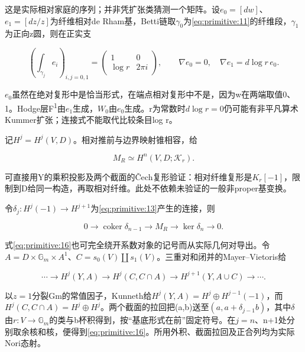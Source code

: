 \documentclass[11pt,a4paper,oneside]{ctexart}
\theoremstyle{cnplain}
\theoremstyle{definition}
\theoremstyle{remark}
\numberwithin{equation}{section}
\begin{document}
这是实际相对家庭的序列；并非凭扩张类猜测一个矩阵。设\(e_0=[dw]\)、\(e_1=[dz/z]\)为纤维相对de Rham基，Betti链取\(\gamma _0\)为\eqref{eq:primitive:11}的纤维段，\(\gamma _1\)为正向z圆，则在正实支

\begin{equation}
\left(\int_{\gamma_j}e_i\right)_{i,j=0,1}
       =\begin{pmatrix}1&0\\\log r&2\pi i\end{pmatrix},\qquad
 \nabla e_0=0,\quad \nabla e_1=d\log r\,e_0.                    \label{eq:primitive:14}
\end{equation}

\(e_0\)虽然在绝对复形中是恰当形式，在端点相对复形中不是，因为w在两端取值0、1。Hodge层F\textsuperscript{1}由\(e_1\)生成，\(W_0\)由\(e_0\)生成。r为常数时\(d\log  r=0\)仍可能有非平凡算术Kummer扩张；连接式不能取代比较条目log r。

记\(H^j=H^j(V,D)\)。相对推前与边界映射锥相容，给

\begin{equation}
M_R\simeq H^n(V,D;\mathcal K_r).               \label{eq:primitive:15}
\end{equation}

可直接用Y的乘积投影及两个截面的Čech复形验证：相对纤维复形是\(K_r[- 1]\)，限制到D给同一构造，再取相对纤维。此处不依赖未验证的一般非proper基变换。

令\(\delta _j:H^j(-1)\to H^{j+1}\)为\eqref{eq:primitive:13}产生的连接，则

\begin{equation}
0\longrightarrow\operatorname{coker}\delta_{n-1}
       \longrightarrow M_R\longrightarrow\ker\delta_n\longrightarrow0.
                                                                    \label{eq:primitive:16}
\end{equation}

式\eqref{eq:primitive:16}也可完全绕开系数对象的记号而从实际几何对导出。令\(A=D\times \mathbb G_m\times A^{1}\)、\(C=s_0(V)\)\ensuremath{\coprod}\(s_1(V)\)。三重对和闭并的Mayer--Vietoris给

\begin{equation}
\cdots\to H^j(Y,A)\to H^j(C,C\cap A)
             \to H^{j+1}(Y,A\cup C)\to\cdots .
\end{equation}

以\(z=1\)分裂Gm的常值因子，Kunneth给\(H^j(Y,A)=H^j\oplus H^{j-1}(-1)\)，而\(H^j(C,C\cap A)=H^j\oplus H^j\)。两个截面的拉回把(a,b)送至\((a,a+\delta _{j-1}b)\)，其中\(\delta \)由\(r:V\to \mathbb G_m\)的类与b杯积得到，按``基底形式在前''固定符号。在\(j=n\)、n+1处分别取余核和核，便得到\eqref{eq:primitive:16}。所用外积、截面拉回及正合列均为实际Nori态射。
\end{document}
